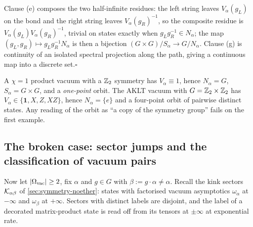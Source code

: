 Clause (e) composes the two half-infinite residues: the left string leaves
$V_\alpha(g_L)$ on the bond and the right string leaves $V_\alpha(g_R)^{-1}$, so
the composite residue is $V_\alpha(g_L)V_\alpha(g_R)^{-1}$, trivial on states
exactly when $g_Lg_R^{-1}\in N_\alpha$; the map
$(g_L,g_R)\mapsto g_Lg_R^{-1}N_\alpha$ is then a bijection
$(G\times G)/S_\alpha\to G/N_\alpha$.  Clause (g) is continuity of an isolated
spectral projection along the path, giving a continuous map into a discrete
set.\hfill$\square$

\begin{remark}
A $\chi=1$ product vacuum with a $\mathbb{Z}_2$ symmetry has $V_\alpha\equiv1$, hence
$N_\alpha=G$, $S_\alpha=G\times G$, and a \emph{one-point} orbit.  The AKLT
vacuum with $G=\mathbb{Z}_2\times\mathbb{Z}_2$ has $V_\alpha\in\{\mathbf{1},X,Z,XZ\}$, hence
$N_\alpha=\{e\}$ and a four-point orbit of pairwise distinct states.  Any reading
of the orbit as ``a copy of the symmetry group'' fails on the first example.
\end{remark}

\subsection{The broken case: sector jumps and the classification of vacuum pairs}

Now let $\lvert \Omega_{\mathrm{vac}}\rvert\ge2$, fix $\alpha$ and $g\in G$ with
$\beta:=g\cdot\alpha\neq\alpha$.  Recall the kink sectors $\mathcal{K}_{\alpha\beta}$ of
\cref{sec:symmetry-noether}: states with factorised vacuum asymptotics
$\omega_\alpha$ at $-\infty$ and $\omega_\beta$ at $+\infty$.  Sectors with
distinct labels are disjoint, and the label of a decorated matrix-product state
is read off from its tensors at $\pm\infty$ at exponential rate.

